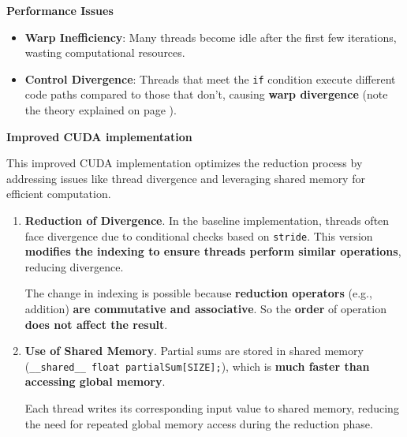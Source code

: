 \begin{flushleft}
    \textcolor{Red2}{ \textbf{Performance Issues}}
\end{flushleft}
\begin{itemize}[label=\textcolor{Red2}{}]
    \item \textcolor{Red2}{\textbf{Warp Inefficiency}}: Many threads become idle after the first few iterations, wasting computational resources.
    \item \textcolor{Red2}{\textbf{Control Divergence}}: Threads that meet the \texttt{if} condition execute different code paths compared to those that don't, causing \textbf{warp divergence} (note the theory explained on page \pageref{definition: Warp Divergence}).
\end{itemize}

\newpage

\begin{flushleft}
    \textcolor{Green3}{\faIcon{\speedIcon} \textbf{Improved CUDA implementation}}
\end{flushleft}
This improved CUDA implementation optimizes the reduction process by addressing issues like thread divergence and leveraging shared memory for efficient computation.
\begin{enumerate}[label=\textcolor{Green3}{\faIcon{check}}]
    \item \textcolor{Green3}{\textbf{Reduction of Divergence}}. In the baseline implementation, threads often face divergence due to conditional checks based on \texttt{stride}. This version \textbf{modifies the indexing to ensure threads perform similar operations}, reducing divergence.

    The change in indexing is possible because \textbf{reduction operators} (e.g., addition) \textbf{are commutative and associative}. So the \textbf{order} of operation \textbf{does not affect the result}.

    
    \item \textcolor{Green3}{\textbf{Use of Shared Memory}}. Partial sums are stored in shared memory (\texttt{\_\_shared\_\_ float partialSum[SIZE];}), which is \textbf{much faster than accessing global memory}.
    
    Each thread writes its corresponding input value to shared memory, reducing the need for repeated global memory access during the reduction phase.
\end{enumerate}

